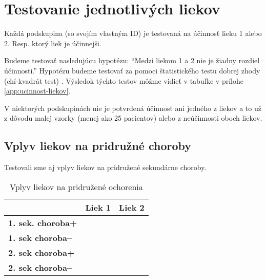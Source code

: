 \section{Testovanie jednotlivých liekov}

Každá podskupina (so svojím vlastným ID) je testovaná na účinnosť lieku 1 alebo 2. Resp. ktorý liek je účinnejši.

Budeme testovať nasledujúcu hypotézu: ``Medzi liekom 1 a 2 nie je žiadny rozdiel účinnosti.'' Hypotézu budeme testovať za pomoci štatistického testu dobrej zhody (chí-kvadrát test) \cite{bib:wiki-chi-squared} \cite{bib:biomedicina-statistika}. Výsledok týchto testov môžme vidieť v tabuľke v prílohe \ref{app:ucinnost-liekov}.

V niektorých podskupinách nie je potvrdená účinnosť ani jedného z liekov a to už z dôvodu malej vzorky (menej ako 25 pacientov) alebo z neúčinnosti oboch liekov.


\subsection{Vplyv liekov na pridružné choroby}

Testovali sme aj vplyv liekov na pridružené sekundárne choroby.

\begin{table}[h!]
\centering
\begin{tabular}{l|ll}
\hline
                          & \textbf{Liek 1} & \textbf{Liek 2} \\ \hline
\textbf{1. sek. choroba+} &                 &                 \\ \hline
\textbf{1. sek choroba--} &                 &                 \\ \hline
\textbf{2. sek choroba+}  &                 &                 \\ \hline
\textbf{2. sek choroba--} &                 &                 \\ \hline
\end{tabular}
\caption{Vplyv liekov na pridružené ochorenia}
\label{tab:sekundarne-ochorenia}
\end{table}